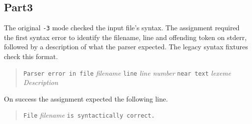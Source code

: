 \documentclass{report}
\newcommand{\+}{}
\begin{document}
    \subsection{Part3}\label{subsec:part3}
    The original \verb|-3| mode checked the input file's syntax. The assignment
    required the first syntax error to identify the filename, line and offending
    token on stderr, followed by a description of what the parser expected.
    The legacy syntax fixtures check this format.

    \begin{quote}
        \texttt{Parser error in file} \emph{filename} \texttt{line}
        \emph{line number} \texttt{near text} \emph{lexeme}\\
        \hspace*{1em}\emph{Description}
    \end{quote}

    On success the assignment expected the following line.

    \begin{quote}
        \verb|File| \emph{filename} \verb|is syntactically correct.|
    \end{quote}
\end{document}
